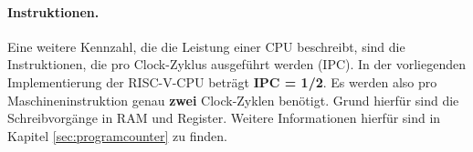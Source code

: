 \paragraph{Instruktionen.} Eine weitere Kennzahl, die die Leistung einer
CPU beschreibt, sind die Instruktionen, die pro Clock-Zyklus ausgeführt
werden (IPC). 
In der vorliegenden Implementierung der RISC-V-CPU beträgt \textbf{IPC =
1/2}. Es werden also pro Maschineninstruktion genau \textbf{zwei}
Clock-Zyklen benötigt. Grund hierfür sind die Schreibvorgänge in RAM und
Register. Weitere Informationen hierfür sind in Kapitel
\ref{sec:programcounter} zu finden.


